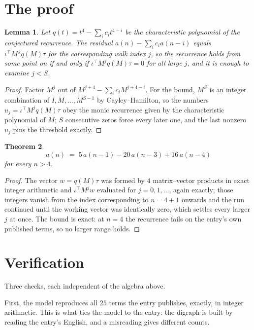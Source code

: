 \documentclass[11pt,a4paper]{article}
\theoremstyle{plain}
\newtheorem{theorem}{Theorem}
\newtheorem{lemma}[theorem]{Lemma}
\theoremstyle{definition}
\begin{document}
\section{The proof}

\begin{lemma}\label{lem:crit}
Let $q(t)=t^{4}-\sum_i c_it^{4-i}$ be the characteristic polynomial of the
conjectured recurrence. The residual $a(n)-\sum_ic_ia(n-i)$ equals
$\iota^{\!\top}M^{\,j}q(M)\tau$ for the corresponding walk index $j$, so the recurrence
holds from some point on if and only if $\iota^{\!\top}M^{j}q(M)\tau=0$ for all large $j$,
and it is enough to examine $j<S$.
\end{lemma}

\begin{proof}
Factor $M^{j}$ out of $M^{j+4}-\sum_ic_iM^{j+4-i}$. For the bound, $M^{S}$
is an integer combination of $I,M,\dots,M^{S-1}$ by Cayley--Hamilton, so the numbers
$u_j=\iota^{\!\top}M^{j}q(M)\tau$ obey the monic recurrence given by the characteristic
polynomial of $M$; $S$ consecutive zeros force every later one, and the last nonzero $u_j$
pins the threshold exactly.
\end{proof}

\begin{theorem}
\[
a(n)\;=\;5\,a(n-1) - 20\,a(n-3) + 16\,a(n-4)
\]
for every $n>4$.
\end{theorem}

\begin{proof}
The vector $w=q(M)\tau$ was formed by $4$ matrix--vector products in exact integer
arithmetic and $\iota^{\!\top}M^{j}w$ evaluated for $j=0,1,\dots$, again exactly; those
integers vanish from the index corresponding to $n=4+1$ onwards and the run continued
until the working vector was identically zero, which settles every larger $j$ at once. The bound is exact: at $n=4$ the recurrence fails on the entry's own published terms, so no larger range holds.
\end{proof}

\section{Verification}

Three checks, each independent of the algebra above.

First, the model reproduces all $25$ terms the entry publishes, exactly, in integer
arithmetic. This is what ties the model to the entry: the digraph is built by reading the
entry's English, and a misreading gives different counts.
\end{document}
